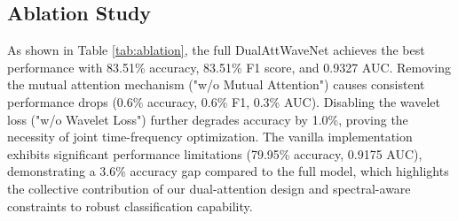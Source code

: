 \documentclass[conference]{IEEEtran}
\begin{document}







\subsection{Ablation Study}

As shown in Table \ref{tab:ablation}, the full DualAttWaveNet achieves the best performance with 83.51\% accuracy, 83.51\% F1 score, and 0.9327 AUC. Removing the mutual attention mechanism ("w/o Mutual Attention") causes consistent performance drops (0.6\% accuracy, 0.6\% F1, 0.3\% AUC). Disabling the wavelet loss ("w/o Wavelet Loss") further degrades accuracy by 1.0\%, proving the necessity of joint time-frequency optimization. The vanilla implementation exhibits significant performance limitations (79.95\% accuracy, 0.9175 AUC), demonstrating a 3.6\% accuracy gap compared to the full model, which highlights the collective contribution of our dual-attention design and spectral-aware constraints to robust classification capability.
\end{document}
